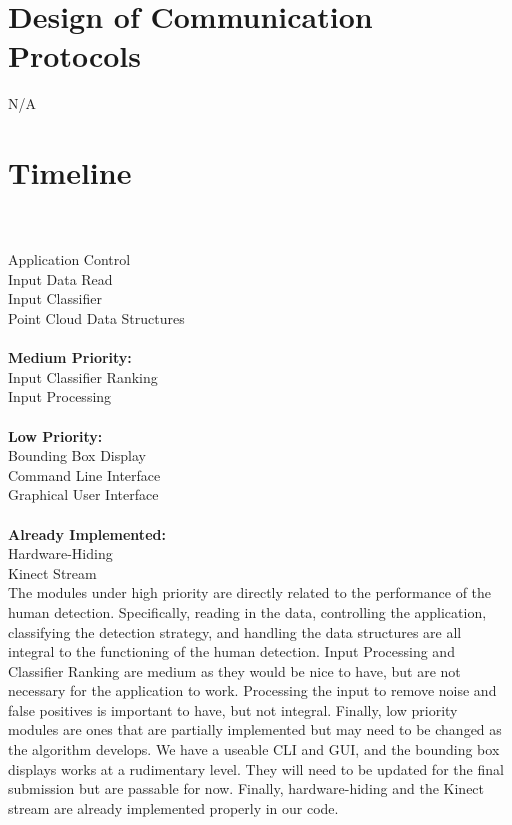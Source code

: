 \documentclass[12pt, titlepage]{article}
\begin{document}
\section{Design of Communication Protocols}

N/A

\section{Timeline}

 \\

\\
Application Control\\
Input Data Read\\
Input Classifier\\
Point Cloud Data Structures\\
\\
\textbf{Medium Priority:}\\
Input Classifier Ranking\\
Input Processing\\
\\
\textbf{Low Priority:}\\
Bounding Box Display\\
Command Line Interface\\
Graphical User Interface\\
\\
\textbf{Already Implemented:}\\
Hardware-Hiding\\
Kinect Stream\\

The modules under high priority are directly related to the performance of the human detection. Specifically, reading in the data, controlling the
application, classifying the detection strategy, and handling the data structures are all integral to the functioning of the human detection. 
Input Processing and Classifier Ranking are medium as they would be nice to have, but are not necessary for the application to work. Processing the input 
to remove noise and false positives is important to have, but not integral. Finally, low priority modules are ones that are partially implemented but may
need to be changed as the algorithm develops. We have a useable CLI and GUI, and the bounding box displays works at a rudimentary level. They will need to be 
updated for the final submission but are passable for now. Finally, hardware-hiding and the Kinect stream are already implemented properly in our code.
\end{document}
